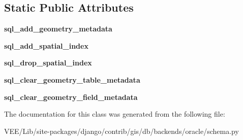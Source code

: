\subsection*{Static Public Attributes}
\begin{DoxyCompactItemize}
\item 
\mbox{\label{classdjango_1_1contrib_1_1gis_1_1db_1_1backends_1_1oracle_1_1schema_1_1_oracle_g_i_s_schema_editor_a7f768dcc26d129b9c872594ad3019387}} 
{\bfseries sql\+\_\+add\+\_\+geometry\+\_\+metadata}
\item 
\mbox{\label{classdjango_1_1contrib_1_1gis_1_1db_1_1backends_1_1oracle_1_1schema_1_1_oracle_g_i_s_schema_editor_acba5e35386b3290b89cca738298c1d97}} 
{\bfseries sql\+\_\+add\+\_\+spatial\+\_\+index}
\item 
\mbox{\label{classdjango_1_1contrib_1_1gis_1_1db_1_1backends_1_1oracle_1_1schema_1_1_oracle_g_i_s_schema_editor_a74ee37eda2c4b955912c70b23b3bdc07}} 
{\bfseries sql\+\_\+drop\+\_\+spatial\+\_\+index}
\item 
\mbox{\label{classdjango_1_1contrib_1_1gis_1_1db_1_1backends_1_1oracle_1_1schema_1_1_oracle_g_i_s_schema_editor_a9d496dc3a48e8047424b1aec5a80974b}} 
{\bfseries sql\+\_\+clear\+\_\+geometry\+\_\+table\+\_\+metadata}
\item 
\mbox{\label{classdjango_1_1contrib_1_1gis_1_1db_1_1backends_1_1oracle_1_1schema_1_1_oracle_g_i_s_schema_editor_a809be493de84ebca8625d7ed920a9109}} 
{\bfseries sql\+\_\+clear\+\_\+geometry\+\_\+field\+\_\+metadata}
\end{DoxyCompactItemize}


The documentation for this class was generated from the following file\+:\begin{DoxyCompactItemize}
\item 
V\+E\+E/\+Lib/site-\/packages/django/contrib/gis/db/backends/oracle/schema.\+py\end{DoxyCompactItemize}
